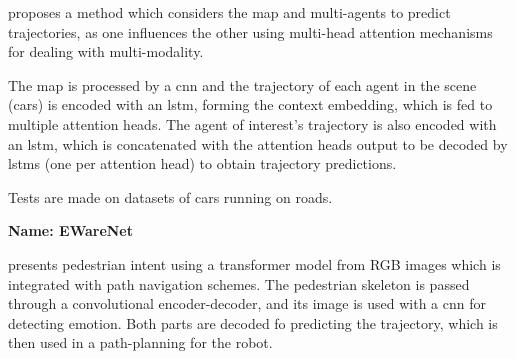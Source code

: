 \cite{messaoud2021trajectory} proposes a method which considers the map and multi-agents to predict trajectories, as one influences the other using multi-head attention mechanisms for dealing with multi-modality.

The map is processed by a \gls{cnn} and the trajectory of each agent in the scene (cars) is encoded with an \gls{lstm}, forming the context embedding, which is fed to multiple attention heads.
%
The agent of interest's trajectory is also encoded with an \gls{lstm}, which is concatenated with the attention heads output to be decoded by \glspl{lstm} (one per attention head) to obtain trajectory predictions.

Tests are made on datasets of cars running on roads.


\textbf{Name: EWareNet}

\cite{narayanan2023ewarenet} presents pedestrian intent using a transformer model from RGB images which is integrated with path navigation schemes.
%
The pedestrian skeleton is passed through a convolutional encoder-decoder, and its image is used with a \gls{cnn} for detecting emotion. 
%
Both parts are decoded fo predicting the trajectory, which is then used in a path-planning for the robot.

